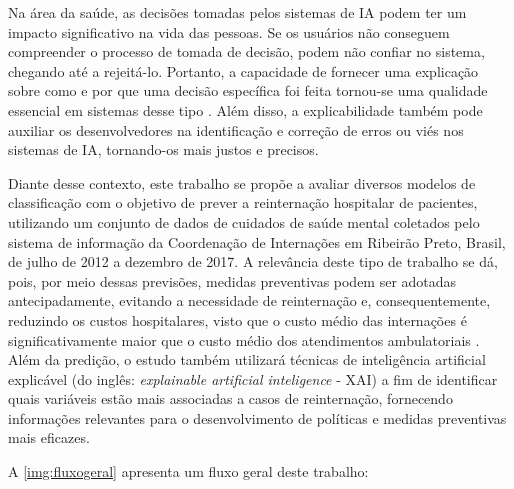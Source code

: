 Na área da saúde, as decisões tomadas pelos sistemas de IA podem ter um impacto significativo na vida das pessoas. Se os usuários não conseguem compreender o processo de tomada de decisão, podem não confiar no sistema, chegando até a rejeitá-lo. Portanto, a capacidade de fornecer uma explicação sobre como e por que uma decisão específica foi feita tornou-se uma qualidade essencial em sistemas desse tipo \cite{WagnerBenedikt2021Ahpo}. Além disso, a explicabilidade também pode auxiliar os desenvolvedores na identificação e correção de erros ou viés nos sistemas de IA, tornando-os mais justos e precisos.

Diante desse contexto, este trabalho se propõe a avaliar diversos modelos de classificação com o objetivo de prever a reinternação hospitalar de pacientes, utilizando um conjunto de dados de cuidados de saúde mental coletados pelo sistema de informação da Coordenação de Internações em Ribeirão Preto, Brasil, de julho de 2012 a dezembro de 2017. A relevância deste tipo de trabalho se dá, pois, por meio dessas previsões, medidas preventivas podem ser adotadas antecipadamente, evitando a necessidade de reinternação e, consequentemente, reduzindo os custos hospitalares, visto que o custo médio das internações é significativamente maior que o custo médio dos atendimentos ambulatoriais \cite{cesconetto2008}. Além da predição, o estudo também utilizará técnicas de inteligência artificial explicável (do inglês: \textit{explainable artificial inteligence} - XAI) a fim de identificar quais variáveis estão mais associadas a casos de reinternação, fornecendo informações relevantes para o desenvolvimento de políticas e medidas preventivas mais eficazes.

A \autoref{img:fluxogeral} apresenta um fluxo geral deste trabalho:

